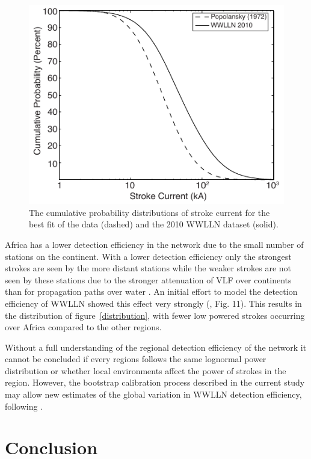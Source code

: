 \begin{figure}[ht!]
   \centering
   \includegraphics[scale=.6]{energy/Figures/PPS_CDF.pdf}
 \caption{The cumulative probability distributions of stroke current for the best fit of the \citet{Popolansky1972} data (dashed) and the 2010 WWLLN dataset (solid).}
 \label{PPS_CDF}
 \end{figure}

Africa has a lower detection efficiency in the network due to the small number of stations on the continent.
With a lower detection efficiency only the strongest strokes are seen by the more distant stations while the weaker strokes are not seen by these stations due to the stronger attenuation of VLF over continents than for propagation paths over water \citep{Wait1970}.
An initial effort to model the detection efficiency of WWLLN showed this effect very strongly (\citet{Rodger2006}, Fig. 11).
This results in the distribution of figure~\ref{distribution}, with fewer low powered strokes occurring over Africa compared to the other regions.

Without a full understanding of the regional detection efficiency of the network it cannot be concluded if every regions follows the same lognormal power distribution or whether local environments affect the power of strokes in the region.
However, the bootstrap calibration process described in the current study may allow new estimates of the global variation in WWLLN detection efficiency, following \citet{Rodger2006}.

\section{Conclusion}

